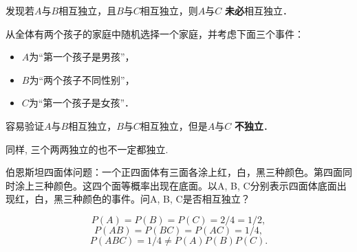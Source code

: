 发现若$A$与$B$相互独立，且$B$与$C$相互独立，则$A$与$C$ \textbf{未必}相互独立．
\begin{example}
    从全体有两个孩子的家庭中随机选择一个家庭，并考虑下面三个事件：
    \begin{itemize}
        \item $A$为“第一个孩子是男孩”，
        \item $B$为“两个孩子不同性别”，
        \item $C$为“第一个孩子是女孩”．
    \end{itemize}
    容易验证$A$与$B$相互独立，$B$与$C$相互独立，但是$A$与$C$ \textbf{不独立}．

    同样, 三个两两独立的也不一定都独立. 

    伯恩斯坦四面体问题：一个正四面体有三面各涂上红，白，黑三种颜色。第四面同时涂上三种颜色。这四个面等概率出现在底面。以A, B, C分别表示四面体底面出现红，白，黑三种颜色的事件。问A, B, C是否相互独立？

    $$
            P(A)=P(B)=P(C)=2/4=1/2,
        $$
        $$
            P(AB)=P(BC)=P(AC)=1/4,
        $$
        $$
            P(ABC)=1/4\neq P(A)P(B)P(C).
        $$
\end{example}
